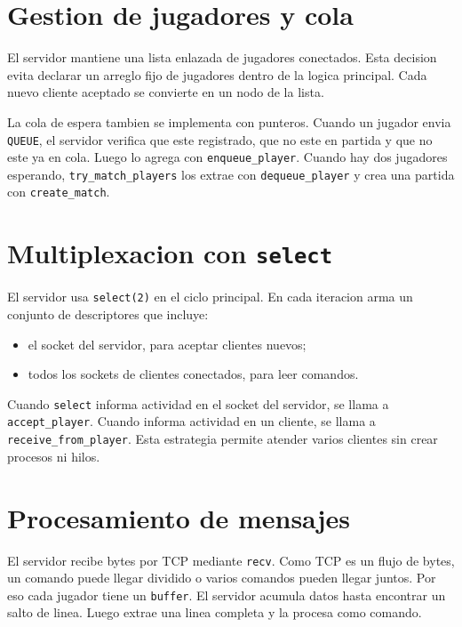 \documentclass[12pt,a4paper]{article}
\begin{document}
\section{Gestion de jugadores y cola}

El servidor mantiene una lista enlazada de jugadores conectados. Esta decision
evita declarar un arreglo fijo de jugadores dentro de la logica principal. Cada
nuevo cliente aceptado se convierte en un nodo de la lista.

La cola de espera tambien se implementa con punteros. Cuando un jugador envia
\texttt{QUEUE}, el servidor verifica que este registrado, que no este en partida
y que no este ya en cola. Luego lo agrega con \texttt{enqueue\_player}. Cuando
hay dos jugadores esperando, \texttt{try\_match\_players} los extrae con
\texttt{dequeue\_player} y crea una partida con \texttt{create\_match}.

\section{Multiplexacion con \texttt{select}}

El servidor usa \texttt{select(2)} en el ciclo principal. En cada iteracion arma
un conjunto de descriptores que incluye:

\begin{itemize}
    \item el socket del servidor, para aceptar clientes nuevos;
    \item todos los sockets de clientes conectados, para leer comandos.
\end{itemize}

Cuando \texttt{select} informa actividad en el socket del servidor, se llama a
\texttt{accept\_player}. Cuando informa actividad en un cliente, se llama a
\texttt{receive\_from\_player}. Esta estrategia permite atender varios clientes
sin crear procesos ni hilos.

\section{Procesamiento de mensajes}

El servidor recibe bytes por TCP mediante \texttt{recv}. Como TCP es un flujo de
bytes, un comando puede llegar dividido o varios comandos pueden llegar juntos.
Por eso cada jugador tiene un \texttt{buffer}. El servidor acumula datos hasta
encontrar un salto de linea. Luego extrae una linea completa y la procesa como
comando.
\end{document}
